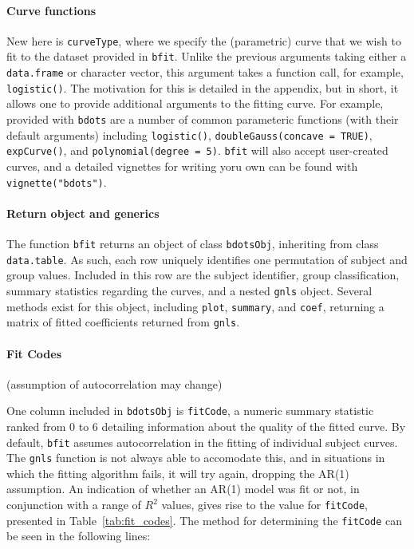 \documentclass{article}
\newcommand{\xt}{\texttt}%
\begin{document}
\paragraph{Curve functions} New here is \xt{curveType}, where we specify the (parametric) curve that we wish to  fit to the dataset provided in \xt{bfit}. Unlike the previous arguments taking either a \xt{data.frame} or character vector, this argument takes a function call, for example, \xt{logistic()}. The motivation for this is detailed in the appendix, but in short, it allows one to provide additional arguments to the fitting curve. For example, provided with \xt{bdots} are a number of common parameteric functions (with their default arguments) including \xt{logistic()}, \xt{doubleGauss(concave = TRUE)}, \xt{expCurve()}, and \xt{polynomial(degree = 5)}. \xt{bfit} will also accept user-created curves, and a detailed vignettes for writing yoru own can be found with \xt{vignette("bdots")}.


\paragraph{Return object and generics}


The function \texttt{bfit} returns an object of class \texttt{bdotsObj}, inheriting from class \texttt{data.table}. As such, each row uniquely identifies one permutation of subject and group values. Included in this row are the subject identifier, group classification, summary statistics regarding the curves, and a nested \xt{gnls} object. Several methods exist for this object, including \texttt{plot}, \texttt{summary}, and \texttt{coef}, returning a matrix of fitted coefficients returned from \texttt{gnls}. 


\paragraph{Fit Codes}

(assumption of autocorrelation may change)

One column included in \xt{bdotsObj} is \xt{fitCode}, a numeric summary statistic ranked from 0 to 6 detailing information about the quality of the fitted curve. By default, \xt{bfit} assumes autocorrelation in the fitting of individual subject curves. The \xt{gnls} function is not always able to accomodate this, and in situations in which the fitting algorithm fails, it will try again, dropping the AR(1) assumption. An indication of whether an AR(1) model was fit or not, in conjunction with a range of $R^2$ values, gives rise to the value for \xt{fitCode}, presented in Table~\ref{tab:fit_codes}. The method for determining the \xt{fitCode} can be seen in the following lines:
\end{document}
